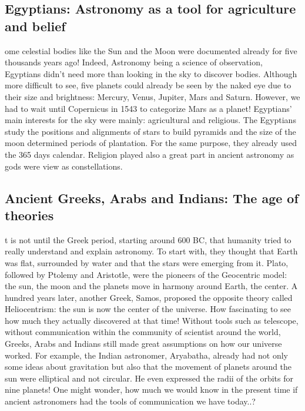\subsection*{Egyptians: Astronomy as a tool for agriculture and belief}
ome celestial bodies like the Sun and the Moon were documented already for five thousands years ago!
Indeed, Astronomy being a science of observation, Egyptians didn't need more than looking in the sky to discover bodies.
Although more difficult to see, five planets could already be seen by the naked eye due to their size and brightness:
Mercury, Venus, Jupiter, Mars and Saturn.
However, we had to wait until Copernicus in 1543 to categorize Mars as a planet!
Egyptians' main interests for the sky were mainly: agricultural and religious.
The Egyptians study the positions and alignments of stars to build pyramids and the size of the moon determined periods of plantation.
For the same purpose, they already used the 365 days calendar.
Religion played also a great part in ancient astronomy as gods were view as constellations.

\subsection*{Ancient Greeks, Arabs and Indians: The age of theories}
t is not until the Greek period, starting around 600 BC, that humanity tried to really understand and explain astronomy. 
To start with, they thought that Earth was flat, surrounded by water and that the stars were emerging from it. 
Plato, followed by Ptolemy and Aristotle, were the pioneers of the Geocentric model: the sun, the moon and the planets move in harmony around Earth, the center. 
A hundred years later, another Greek, Samos, proposed the opposite theory called Heliocentrism: the sun is now the center of the universe. 
How fascinating to see how much they actually discovered at that time!  
Without tools such as telescope, without communication within the community of scientist around the world, Greeks, Arabs and Indians still made great assumptions on how our universe worked. 
For example, the Indian astronomer, Aryabatha, already had not only some ideas about gravitation but also that the movement of planets around the sun were elliptical and not circular. 
He even expressed the radii of the orbits for nine planets! 
One might wonder, how much we would know in the present time if ancient astronomers had the tools of communication we have today..?

